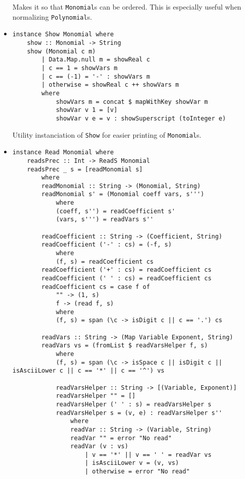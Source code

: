 \documentclass[11pt,a4paper]{article}
\begin{document}
\begin{itemize}
          Makes it so that \lstinline{Monomial}s can be ordered. This is especially useful when normalizing \lstinline{Polynomial}s.

    \item \begin{lstlisting}
instance Show Monomial where
    show :: Monomial -> String
    show (Monomial c m)
        | Data.Map.null m = showReal c
        | c == 1 = showVars m
        | c == (-1) = '-' : showVars m
        | otherwise = showReal c ++ showVars m
        where
            showVars m = concat $ mapWithKey showVar m
            showVar v 1 = [v]
            showVar v e = v : showSuperscript (toInteger e)
    \end{lstlisting}

          Utility instanciation of \lstinline{Show} for easier printing of \lstinline{Monomial}s.

    \item \begin{lstlisting}
instance Read Monomial where
    readsPrec :: Int -> ReadS Monomial
    readsPrec _ s = [readMonomial s]
        where
        readMonomial :: String -> (Monomial, String)
        readMonomial s' = (Monomial coeff vars, s''')
            where
            (coeff, s'') = readCoefficient s'
            (vars, s''') = readVars s''
    
        readCoefficient :: String -> (Coefficient, String)
        readCoefficient ('-' : cs) = (-f, s)
            where
            (f, s) = readCoefficient cs
        readCoefficient ('+' : cs) = readCoefficient cs
        readCoefficient (' ' : cs) = readCoefficient cs
        readCoefficient cs = case f of
            "" -> (1, s)
            f -> (read f, s)
            where
            (f, s) = span (\c -> isDigit c || c == '.') cs
    
        readVars :: String -> (Map Variable Exponent, String)
        readVars vs = (fromList $ readVarsHelper f, s)
            where
            (f, s) = span (\c -> isSpace c || isDigit c || isAsciiLower c || c == '*' || c == '^') vs
    
            readVarsHelper :: String -> [(Variable, Exponent)]
            readVarsHelper "" = []
            readVarsHelper (' ' : s) = readVarsHelper s
            readVarsHelper s = (v, e) : readVarsHelper s''
                where
                readVar :: String -> (Variable, String)
                readVar "" = error "No read"
                readVar (v : vs)
                    | v == '*' || v == ' ' = readVar vs
                    | isAsciiLower v = (v, vs)
                    | otherwise = error "No read"
    

\end{lstlisting}
\end{itemize}
\end{document}
